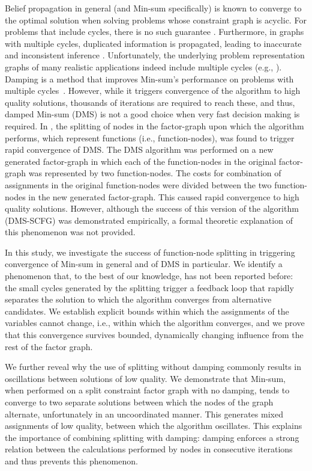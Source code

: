 \documentclass[letterpaper]{article} %
\theoremstyle{definition}
\theoremstyle{remark}
\begin{document}
	Belief propagation in general (and Min-sum specifically) is known to converge to the optimal solution when solving problems whose constraint graph is acyclic. For problems that include cycles, there is no such guarantee \cite{YanoverMW06,FarinelliRPJ08}.  Furthermore, in graphs with multiple cycles, duplicated information is propagated, leading to inaccurate and inconsistent inference \cite{Pearl88}.  Unfortunately, the underlying problem representation graphs of many realistic applications indeed include multiple cycles (e.g., \citet{ModiSTY05,GershmanMZ09}). Damping is a method that improves Min-sum's performance on problems with multiple cycles~\cite{CohenGZ20,ZaedLZ25}. However, while it triggers convergence of the algorithm to high quality solutions, thousands of iterations are required to reach these, and thus, damped Min-sum (DMS) is not a good choice when very fast decision making is required.
In \citet{CohenGZ20}, the splitting of nodes in the factor-graph upon which the algorithm performs, which represent functions (i.e., function-nodes), was found to trigger rapid convergence of DMS. The DMS algorithm was performed on a new generated factor-graph in which each of the function-nodes in the original factor-graph was represented by two function-nodes. The costs for combination of assignments in the original function-nodes were divided between the two function-nodes in the new generated factor-graph. This caused rapid convergence to high quality solutions. However, although the success of this version of the algorithm (DMS-SCFG) was demonstrated empirically, a formal theoretic explanation of this phenomenon was not provided.

In this study, we investigate the success of function-node splitting in triggering convergence of Min-sum in general and of DMS in particular. We identify a phenomenon that, to the best of our knowledge, has not been reported before: the small cycles generated by the splitting trigger a feedback loop that rapidly separates the solution to which the algorithm converges from alternative candidates. We establish explicit bounds within which the assignments of the variables cannot change, i.e., within which the algorithm converges, and we prove that this convergence survives bounded, dynamically changing influence from the rest of the factor graph.

We further reveal why the use of splitting without damping commonly results in oscillations between solutions of low quality. We demonstrate that Min-sum, when performed on a split constraint factor graph with no damping, tends to converge to two separate solutions between which the nodes of the graph alternate, unfortunately in an uncoordinated manner. This generates mixed assignments of low quality, between which the algorithm oscillates. This explains the importance of combining splitting with damping: damping enforces a strong relation between the calculations performed by nodes in consecutive iterations and thus prevents this phenomenon.
\end{document}
